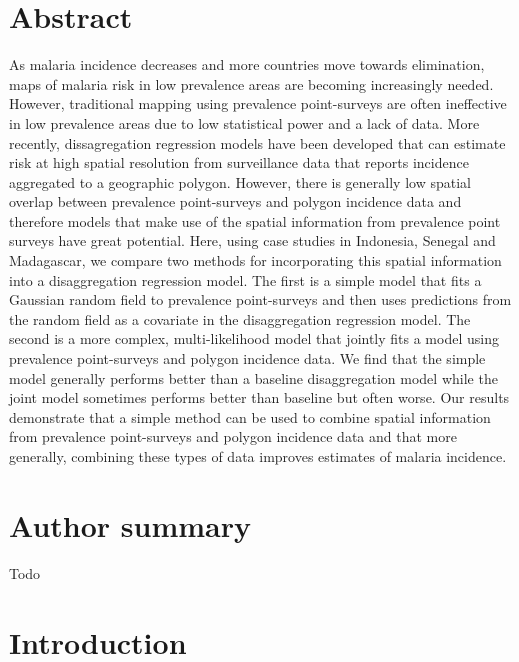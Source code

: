 \documentclass[10pt,letterpaper]{article}
\begin{document}
\section*{Abstract}
As malaria incidence decreases and more countries move towards elimination, maps of malaria risk in low prevalence areas are becoming increasingly needed.
However, traditional mapping using prevalence point-surveys are often ineffective in low prevalence areas due to low statistical power and a lack of data.
More recently, dissagregation regression models have been developed that can estimate risk at high spatial resolution from surveillance data that reports incidence aggregated to a geographic polygon.
However, there is generally low spatial overlap between prevalence point-surveys and polygon incidence data and therefore models that make use of the spatial information from prevalence point surveys have great potential.
Here, using case studies in Indonesia, Senegal and Madagascar, we compare two methods for incorporating this spatial information into a disaggregation regression model.
The first is a simple model that fits a Gaussian random field to prevalence point-surveys and then uses predictions from the random field as a covariate in the disaggregation regression model.
The second is a more complex, multi-likelihood model that jointly fits a model using prevalence point-surveys and  polygon incidence data.
We find that the simple model generally performs better than a baseline disaggregation model while the joint model sometimes performs better than baseline but often worse.
Our results demonstrate that a simple method can be used to combine spatial information from prevalence point-surveys and polygon incidence data and that more generally, combining these types of data improves estimates of malaria incidence.



\section*{Author summary}
Todo


\linenumbers

\section*{Introduction}
\end{document}
